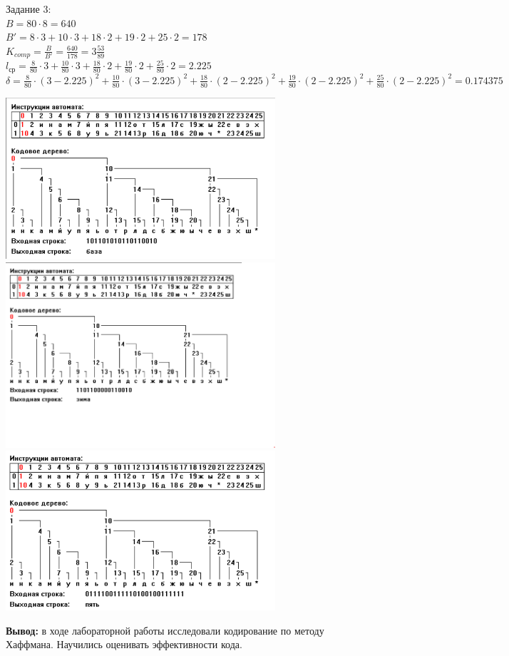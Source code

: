 \documentclass[a4paper,14pt]{extarticle}
\begin{document}
Задание 3:\\
$B = 80 \cdot 8 = 640$\\
$B' = 8 \cdot 3 + 10 \cdot 3 + 18 \cdot 2 + 19 \cdot 2 + 25 \cdot 2 = 178$\\
$K_{comp} = \frac{B}{B'} = \frac{640}{178} = 3\frac{53}{89}$\\
$l_{ср} = \frac{8}{80} \cdot 3 + \frac{10}{80} \cdot 3 + \frac{18}{80} \cdot 2 + \frac{19}{80} \cdot 2 + \frac{25}{80} \cdot 2 = 2.225$\\
$\delta = \frac{8}{80} \cdot (3 - 2.225)^2 + \frac{10}{80} \cdot (3 - 2.225)^2 + \frac{18}{80} \cdot (2 - 2.225)^2 + \frac{19}{80} \cdot (2 - 2.225)^2 + \frac{25}{80} \cdot (2 - 2.225)^2 = 0.174375$\\

\begin{center}
    \includegraphics[width=100mm]{huf1}\\
    \includegraphics[width=100mm]{huf2}\\
    \includegraphics[width=100mm]{huf3}\\
\end{center}
\textbf{Вывод: } в ходе лабораторной работы исследовали кодирование по методу Хаффмана. Научились оценивать эффективности кода.
\end{document}

